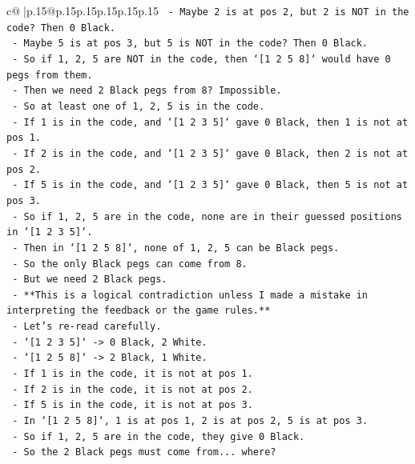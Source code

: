 \documentclass{article}
\begin{document}
{\begin{supertabular}{c@{$\;$}|p{.15\linewidth}@{}p{.15\linewidth}p{.15\linewidth}p{.15\linewidth}p{.15\linewidth}p{.15\linewidth}}
{{{\texttt{        {-} Maybe 2 is at pos 2, but 2 is NOT in the code? Then 0 Black.} \\
\texttt{        {-} Maybe 5 is at pos 3, but 5 is NOT in the code? Then 0 Black.} \\
\texttt{        {-} So if 1, 2, 5 are NOT in the code, then `{[}1 2 5 8{]}` would have 0 pegs from them.} \\
\texttt{        {-} Then we need 2 Black pegs from 8? Impossible.} \\
\texttt{        {-} So at least one of 1, 2, 5 is in the code.} \\
\texttt{        {-} If 1 is in the code, and `{[}1 2 3 5{]}` gave 0 Black, then 1 is not at pos 1.} \\
\texttt{        {-} If 2 is in the code, and `{[}1 2 3 5{]}` gave 0 Black, then 2 is not at pos 2.} \\
\texttt{        {-} If 5 is in the code, and `{[}1 2 3 5{]}` gave 0 Black, then 5 is not at pos 3.} \\
\texttt{        {-} So if 1, 2, 5 are in the code, none are in their guessed positions in `{[}1 2 3 5{]}`.} \\
\texttt{        {-} Then in `{[}1 2 5 8{]}`, none of 1, 2, 5 can be Black pegs.} \\
\texttt{        {-} So the only Black pegs can come from 8.} \\
\texttt{        {-} But we need 2 Black pegs.} \\
\texttt{        {-} **This is a logical contradiction unless I made a mistake in interpreting the feedback or the game rules.**} \\
\texttt{        {-} Let's re{-}read carefully.} \\
\texttt{        {-} `{[}1 2 3 5{]}` {-}> 0 Black, 2 White.} \\
\texttt{        {-} `{[}1 2 5 8{]}` {-}> 2 Black, 1 White.} \\
\texttt{        {-} If 1 is in the code, it is not at pos 1.} \\
\texttt{        {-} If 2 is in the code, it is not at pos 2.} \\
\texttt{        {-} If 5 is in the code, it is not at pos 3.} \\
\texttt{        {-} In `{[}1 2 5 8{]}`, 1 is at pos 1, 2 is at pos 2, 5 is at pos 3.} \\
\texttt{        {-} So if 1, 2, 5 are in the code, they give 0 Black.} \\
\texttt{        {-} So the 2 Black pegs must come from... where?} \\
}}}
\end{supertabular}}
\end{document}
